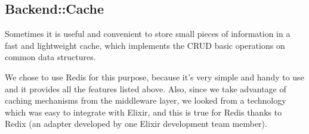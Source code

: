 \subsection{Backend::Cache}
Sometimes it is useful and convenient to store small pieces of
information in a fast and lightweight cache, which implements the CRUD basic
operations on common data structures.

We chose to use Redis for this purpose, because it's very simple and handy to
use and it provides all the features listed above.
Also, since we take advantage of caching mechanisms from the middleware layer,
we looked from a technology which was easy to integrate with Elixir, and this
is true for Redis thanks to Redix (an adapter developed by one Elixir
development team member).
